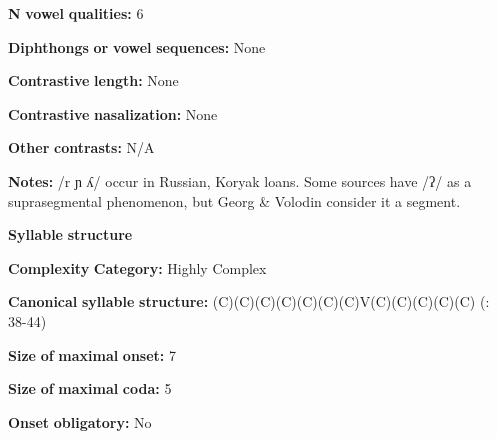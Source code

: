 \documentclass[output=paper]{langsci/langscibook}
\begin{document}
\begin{styleBody}
\textbf{N} \textbf{vowel} \textbf{qualities:} 6
\end{styleBody}

\begin{styleBody}
\textbf{Diphthongs} \textbf{or} \textbf{vowel} \textbf{sequences:} None
\end{styleBody}

\begin{styleBody}
\textbf{Contrastive} \textbf{length:} None
\end{styleBody}

\begin{styleBody}
\textbf{Contrastive} \textbf{nasalization:} None
\end{styleBody}

\begin{styleBody}
\textbf{Other} \textbf{contrasts:} N/A
\end{styleBody}

\begin{styleBody}
\textbf{Notes:} /r ɲ ʎ/ occur in Russian, Koryak loans. Some sources have /ʔ/ as a suprasegmental phenomenon, but Georg \& Volodin consider it a segment. 
\end{styleBody}

\begin{styleBody}
\textbf{Syllable} \textbf{structure}
\end{styleBody}

\begin{styleBody}
\textbf{Complexity} \textbf{Category:} Highly Complex
\end{styleBody}

\begin{styleBody}
\textbf{Canonical} \textbf{syllable} \textbf{structure:} (C)(C)(C)(C)(C)(C)(C)V(C)(C)(C)(C)(C) (\citealt{GeorgVolodin1999}: 38-44)
\end{styleBody}

\begin{styleBody}
\textbf{Size} \textbf{of} \textbf{maximal} \textbf{onset:} 7
\end{styleBody}

\begin{styleBody}
\textbf{Size} \textbf{of} \textbf{maximal} \textbf{coda:} 5
\end{styleBody}

\begin{styleBody}
\textbf{Onset} \textbf{obligatory:} No
\end{styleBody}
\end{document}
